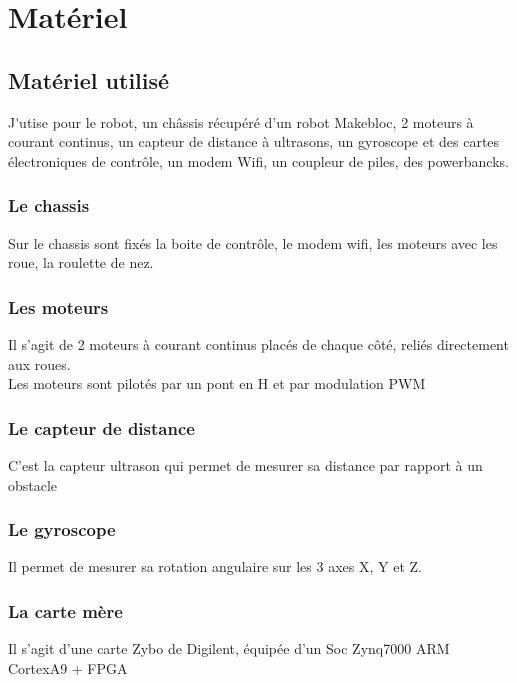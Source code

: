\newpage

\chapter{Matériel}
\section{Matériel utilisé}
\lettrine[lines=1]{J}'utise pour le robot, un châssis récupéré d'un robot Makebloc, 2 moteurs à courant continus, un capteur de distance à ultrasons, un gyroscope et des cartes électroniques de contrôle, un modem  Wifi, un coupleur de piles, des powerbancks.

\subsection{Le chassis}
Sur le chassis sont fixés la boite de contrôle, le modem wifi, les moteurs avec les roue, la roulette de nez.

\subsection{Les moteurs}
Il s'agit de 2 moteurs à courant continus placés de chaque côté, reliés directement aux roues.
\\Les moteurs sont pilotés par un pont en H et par modulation PWM

\subsection{Le capteur de distance}
C'est la capteur ultrason qui permet de mesurer sa distance par rapport à un obstacle

\subsection{Le gyroscope}
Il permet de mesurer sa rotation angulaire sur les 3 axes X, Y et Z.

\subsection{La carte mère }
Il s'agit d'une carte Zybo de Digilent, équipée d'un Soc Zynq7000 ARM CortexA9 + FPGA




 